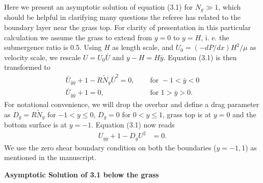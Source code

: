 \documentclass[letterpaper,10pt]{article}
\newcommand{\Rey}{{R}}
\newcommand{\Ndg}{\tilde{N}_g}
\begin{document}
Here we present an asymptotic solution of equation (3.1) for $N_g \gg 1$, which should be helpful in clarifying many questions the referee has related to the boundary layer near the grass top. For clarity of presentation in this particular calculation we assume the grass to extend from $y=0$ to $y=H$, i. e. the submergence ratio is 0.5. 
Using $H$ as length scale, and $U_0 = (-dP/dx)H^2/\mu$ as velocity scale, we rescale $U= U_0 \bar{U}$ and $y-H = H \bar{y}$. 
Equation (3.1) is then transformed to  
\begin{equation}
\begin{split}
 \bar{U}_{\bar{y}\bar{y}}+1 - \Rey \Ndg \bar{U}^2 =0, \quad &\text{ for } -1<\bar{y}<0\\
 \bar{U}_{\bar{y}\bar{y}}+1 =0, \quad &\text{ for } 1>\bar{y}>0.
\end{split}
\end{equation}
For notational convenience, we will drop the overbar and define a drag parameter as $D_g = R\Ndg$ for $-1<y\le 0$, $D_g = 0$ for $0<y\le 1$, grass top is at $y=0$ and the bottom surface is at $y=-1$. Equation (3.1) now reads
\begin{equation}
\begin{split}
 {U}_{{y}{y}}+1 - D_g{U}^2 &=0.
\end{split}
\end{equation}
We use the zero shear boundary condition on both the boundaries ($y=-1,1$) as mentioned in the manuscript.

\vspace{2mm}
\noindent
\textbf{Asymptotic Solution of 3.1 below the grass}
\vspace{1mm}
\end{document}
